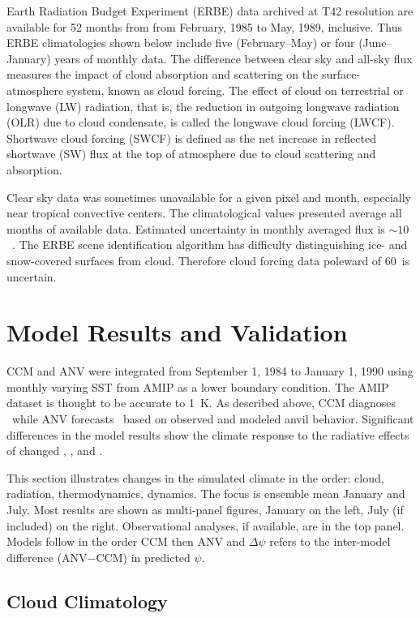\documentclass[agums]{aguplus}
\begin{document}
Earth Radiation Budget Experiment (ERBE) data archived at T42
resolution \cite[]{HuC92} are available for 52 months from from
February, 1985 to May, 1989, inclusive. 
Thus ERBE climatologies shown below include five (February--May) or
four (June--January) years of monthly data.
The difference between clear sky and all-sky flux measures the impact
of cloud absorption and scattering on the surface-atmosphere system,
known as cloud forcing. 
The effect of cloud on terrestrial or longwave (LW) radiation, that
is, the reduction in outgoing longwave radiation (OLR) due to cloud
condensate, is called the longwave cloud forcing (LWCF).
Shortwave cloud forcing (SWCF) is defined as the net increase in
reflected shortwave (SW) flux at the top of atmosphere due to
cloud scattering and absorption.

Clear sky data was sometimes unavailable for a given pixel and month,
especially near tropical convective centers.
The climatological values presented average all months of available
data. 
Estimated uncertainty in monthly averaged flux is $\sim 10$~\wxmS.  
The ERBE scene identification algorithm has difficulty distinguishing
ice- and snow-covered surfaces from cloud. 
Therefore cloud forcing data poleward of 60\dgr\ is uncertain.

\section{Model Results and Validation}\label{sec:vld}

CCM and ANV were integrated from September 1, 1984 to January 1, 1990 
using monthly varying SST from AMIP \cite[]{Gat92} as a lower
boundary condition. 
The AMIP dataset is thought to be accurate to 1~\dgr K.
As described above, CCM diagnoses \qi\ while ANV forecasts \qi\ based
on observed and modeled anvil behavior.
Significant differences in the model results show the climate response
to the radiative effects of changed \qc, \fice, and \rdsffc. 

This section illustrates changes in the simulated climate in the
order: cloud, radiation, thermodynamics, dynamics.
The focus is ensemble mean January and July.
Most results are shown as multi-panel figures, January on the left,
July (if included) on the right. 
Observational analyses, if available, are in the top panel.
Models follow in the order CCM then ANV and $\Delta \psi$ refers to 
the inter-model difference (ANV$-$CCM) in predicted $\psi$. 

\subsection{Cloud Climatology}\label{sec:cld}
\end{document}

